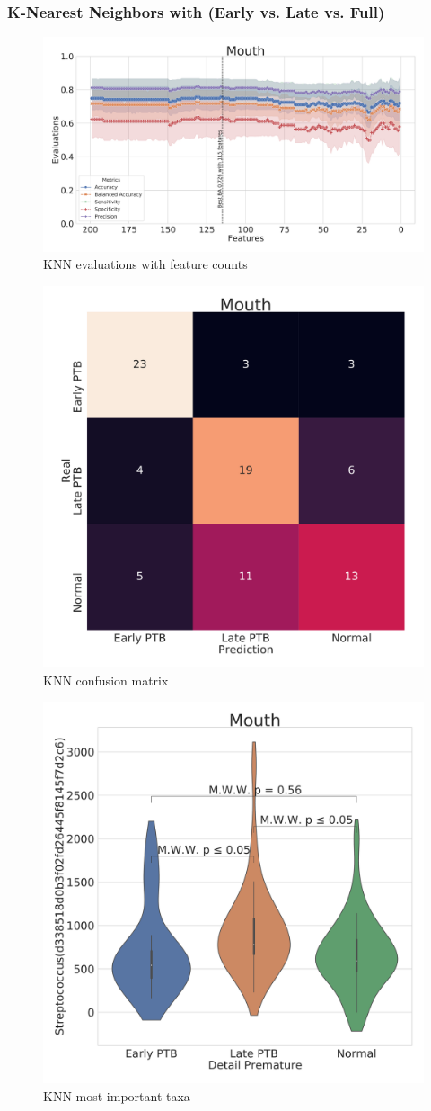 \documentclass{beamer}
\begin{document}
    \begin{frame}[allowframebreaks]
        \frametitle{K-Nearest Neighbors with (Early vs. Late vs. Full)}

        \begin{figure}
            \includegraphics[width=0.8 \linewidth]{figures/KNN/KNN.DADA2.homd/Mouth+metrics.pdf}
            \caption{KNN evaluations with feature counts}
        \end{figure}

        \begin{figure}
            \includegraphics[width=0.5 \linewidth]{figures/KNN/KNN.DADA2.homd/Mouth+heatmap.pdf}
            \caption{KNN confusion matrix}
        \end{figure}

        \begin{figure}
            \includegraphics[width=0.5 \linewidth]{figures/KNN/KNN.DADA2.homd/Mouth+Violin_0.pdf}
            \caption{KNN most important taxa}
        \end{figure}
    \end{frame}
\end{document}
